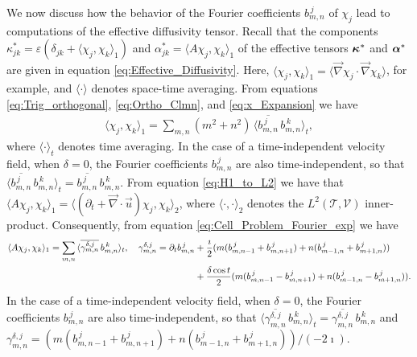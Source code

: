 \documentclass[11pt]{amsart}
\newcommand{\Tc}{\mathcal{T}}
\newcommand{\Vc}{\mathcal{V}}
\newcommand\balpha{\mbox{\boldmath${\alpha}$}}
\newcommand\bkappa{\mbox{\boldmath${\kappa}$}}
\begin{document}
We now discuss how the behavior of the Fourier coefficients
$b^{\,j}_{m,n}$ of $\chi_j$ lead to computations
of the effective diffusivity tensor. Recall that the components
$\kappa^*_{jk}=\varepsilon(\delta_{jk}+\langle\chi_j,\chi_k\rangle_1)$ and $\alpha^*_{jk}=\langle A\chi_j,\chi_k\rangle_1$ of the
effective tensors $\bkappa^*$ and $\balpha^*$ are given in equation
\eqref{eq:Effective_Diffusivity}. Here,
$\langle\chi_j,\chi_k\rangle_1=\langle\vec{\nabla}\chi_j\cdot\vec{\nabla}\chi_k\rangle$, for example, and $\langle\cdot\rangle$ denotes
space-time averaging.
From equations
\eqref{eq:Trig_orthogonal}, \eqref{eq:Ortho_Clmn}, and
\eqref{eq:x_Expansion} we have    
%
\begin{align}
  \langle\chi_j,\chi_k\rangle_1=\sum_{m,n}(m^2+n^2)\,\langle\overline{b^{\,j}_{m,n}}\,b^{\,k}_{m,n}\rangle_t,
\end{align}
%
where $\langle\cdot\rangle_t$ denotes time averaging.
In the case of a
time-independent velocity field, when $\delta=0$, the Fourier
coefficients $b^{\,j}_{m,n}$ are also time-independent, so that
$\langle\overline{b^{\,j}_{m,n}}\,b^{\,k}_{m,n}\rangle_t=\overline{b^{\,j}_{m,n}}\,b^{\,k}_{m,n}$. From
equation \eqref{eq:H1_to_L2} we have that
$\langle A\chi_j,\chi_k\rangle_1=\langle(\partial_t+\vec{\nabla}\cdot\vec{u})\chi_j,\chi_k\rangle_2$, where $\langle\cdot,\cdot\rangle_2$
denotes the $L^2(\Tc,\Vc)$ inner-product. Consequently,
from equation
\eqref{eq:Cell_Problem_Fourier_exp} we have  
%
\begin{align}
  \langle A\chi_j,\chi_k\rangle_1=\sum_{m,n}\,\langle\overline{\gamma_{m,n}^{\delta,j}}\,b^{\,k}_{m,n}\rangle_t,\quad
  \gamma_{m,n}^{\delta,j}=\partial_tb^{\,j}_{m,n}
    &+\frac{\imath}{2}(m(b^{\,j}_{m,n-1}+b^{\,j}_{m,n+1})+n(b^{\,j}_{m-1,n}+b^{\,j}_{m+1,n}))
    \\
    &+\frac{\delta\cos{t}}{2}(m(b^{\,j}_{m,n-1}-b^{\,j}_{m,n+1})+n(b^{\,j}_{m-1,n}-b^{\,j}_{m+1,n})).
  \notag
\end{align}
%
In the case of a time-independent velocity field, when $\delta=0$, the
Fourier coefficients $b^{\,j}_{m,n}$ are also time-independent, so that
$\langle\overline{\gamma^{\delta,j}_{m,n}}\,b^{\,k}_{m,n}\rangle_t=\overline{\gamma^{\delta,j}_{m,n}}\,b^{\,k}_{m,n}$
and
$\gamma_{m,n}^{\delta,j}=(m(b^{\,j}_{m,n-1}+b^{\,j}_{m,n+1})+n(b^{\,j}_{m-1,n}+b^{\,j}_{m+1,n}))/(-2\imath)$.
\end{document}
